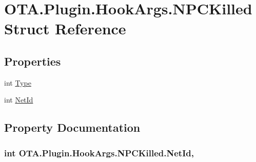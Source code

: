 \hypertarget{struct_o_t_a_1_1_plugin_1_1_hook_args_1_1_n_p_c_killed}{}\section{O\+T\+A.\+Plugin.\+Hook\+Args.\+N\+P\+C\+Killed Struct Reference}
\label{struct_o_t_a_1_1_plugin_1_1_hook_args_1_1_n_p_c_killed}
\subsection*{Properties}
\begin{DoxyCompactItemize}
\item 
int \hyperlink{struct_o_t_a_1_1_plugin_1_1_hook_args_1_1_n_p_c_killed_ab65f8272aad0965ebd94537273e53d73}{Type}
\item 
int \hyperlink{struct_o_t_a_1_1_plugin_1_1_hook_args_1_1_n_p_c_killed_a6e5c4d70fefceb75afa88d539bae8a24}{Net\+Id}
\end{DoxyCompactItemize}


\subsection{Property Documentation}
\hypertarget{struct_o_t_a_1_1_plugin_1_1_hook_args_1_1_n_p_c_killed_a6e5c4d70fefceb75afa88d539bae8a24}{}
\subsubsection[{Net\+Id}]{\setlength{\rightskip}{0pt plus 5cm}int O\+T\+A.\+Plugin.\+Hook\+Args.\+N\+P\+C\+Killed.\+Net\+Id\hspace{0.3cm}{\ttfamily [get]}, {\ttfamily [set]}}\label{struct_o_t_a_1_1_plugin_1_1_hook_args_1_1_n_p_c_killed_a6e5c4d70fefceb75afa88d539bae8a24}
\hypertarget{struct_o_t_a_1_1_plugin_1_1_hook_args_1_1_n_p_c_killed_ab65f8272aad0965ebd94537273e53d73}{}
